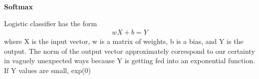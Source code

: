 \documentclass{article}
\begin{document}
\begin{center}{\huge\bf Softmax}\end{center}

Logistic classifier has the form
\begin{align}
wX+b=Y
\end{align}
where X is the input vector, w is a matrix of weights, b is a bias, and Y is the output.
The norm of the output vector approximately correspond to our certainty in vaguely
unexpected ways because Y is getting fed into an exponential function. If Y values
are small, exp(0) 
\end{document}
